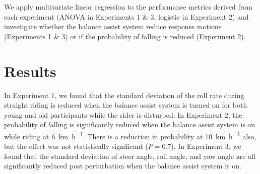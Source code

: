 \documentclass{icsc}
\def\kph{\kilo\meter\per\hour}
\begin{document}
\begin{figure}
  \begin{center}
    \label{fig:fig1}
  \end{center}
\end{figure}

We apply multivariate linear regression to the performance metrics derived from
each experiment (ANOVA in Experiments 1 \& 3, logistic in Experiment 2) and
investigate whether the balance assist system reduce response motions
(Experiments 1 \& 3) or if the probability of falling is reduced (Experiment
2).

\section{Results}
%
In Experiment 1, we found that the standard deviation of the roll rate during
straight riding is reduced when the balance assist system is turned on for both
young and old participants while the rider is disturbed. In Experiment 2, the
probability of falling is significantly reduced when the balance assist system
is on while riding at 6~\si{\kph}. There is a reduction in probability at
10~\si{\kph} also, but the effect was not statistically significant
(\(P=0.7\)). In Experiment 3, we found that the standard deviation of steer
angle, roll angle, and yaw angle are all significantly reduced post
perturbation when the balance assist system is on.
\end{document}
